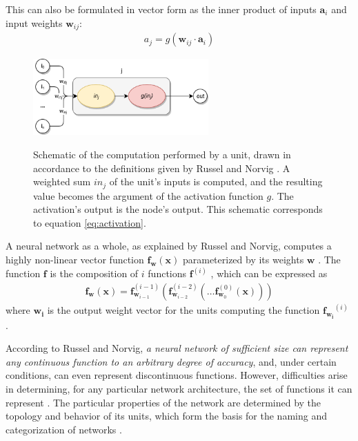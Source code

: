 \documentclass[12pt, titlepage]{report}
\theoremstyle{definition}
\begin{document}
This can also be formulated in vector form as the inner product of inputs $\bm{a}_i$ and input weights $\bm{w}_{ij}$:
\begin{gather}\label{eq:activation_vector}
a_j = g(\bm{w}_{ij}\cdot\bm{a}_i)
\end{gather}

\begin{figure}
\centering
\includegraphics[width=0.6\textwidth]{img/neuron.png}\\
\caption{Schematic of the computation performed by a unit, drawn in accordance to the definitions given by Russel and Norvig \cite[p.728]{russel2009artificial}. A weighted sum $in_j$ of the unit's inputs is computed, and the resulting value becomes the argument of the activation function $g$. The activation's output is the node's output. This schematic corresponds to equation \ref{eq:activation}.}
\label{figure:neural_unit}
\end{figure}

A neural network as a whole, as explained by Russel and Norvig, computes a highly non-linear vector function $\bm{f}_{\bm{w}}(\bm{x})$ parameterized by its weights $\bm{w}$ \cite[p. 731, 732]{russel2009artificial}. The function $\bm{f}$ is the composition of $i$ functions $\bm{f}^{(i)}$ \cite[p. 164]{goodfellow2016deep}, which can be expressed as
 \begin{gather}\label{eq:neural_net_composition}
 \bm{f_w}(\bm{x}) = \bm{f}_{\bm{w}_{i-1}}^{(i-1)} (\bm{f}_{\bm{w}_{i-2}}^{(i-2)} ( \ldots \bm{f}_{\bm{w}_{0}}^{(0)}(\bm{x})))
\end{gather}
where $\bm{w_i}$ is the output weight vector for the units computing the function $\bm{f_{w_i}}^{(i)}$ \cite{goodfellow2016deep}.

According to Russel and Norvig, \emph{a neural network of sufficient size can represent any continuous function to an arbitrary degree of accuracy}, and, under certain conditions, can even represent discontinuous functions. However, difficulties arise in determining, for any particular network architecture, the set of functions it can represent \cite[p. 732]{russel2009artificial}. The particular properties of the network are determined by the topology and behavior of its units, which form the basis for the naming and categorization of networks \cite[p. 729]{russel2009artificial}.
\end{document}
